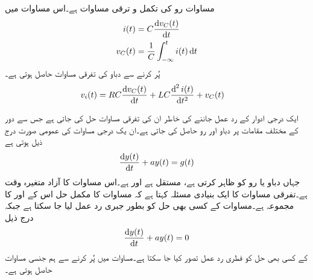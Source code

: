 مساوات  رو   کی تکمل و ترقی مساوات ہے۔اس مساوات میں 
\begin{align*}
i(t)&=C\frac{\dif v_C(t)}{\dif t}\\
v_C(t)&=\frac{1}{C}\int_{-\infty}^{t} i(t)\dif t
\end{align*}
پُر کرنے سے دباو  کی تفرقی مساوات حاصل ہوتی ہے۔
\begin{align}\label{مساوات_عارضی_تکمل_و_تفرقی_ب}
v_i(t)&=R C\frac{\dif v_C(t)}{\dif t}+LC\frac{\dif^{\,2} i(t)}{\dif t^2}+v_C(t)
\end{align}

ایک درجی ادوار کے رد عمل جاننے کی خاطر ان کی تفرقی مساوات حل کی جاتی ہے جس سے دور کے مختلف مقامات پر دباو اور رو حاصل کی جاتی ہے۔ان یک درجی مساوات کی عمومی صورت درج ذیل ہوتی ہے
\begin{align}\label{مساوات_عارضی_یک_درجی_عمومی_مساوات}
\frac{\dif y(t)}{\dif t}+a y(t)= g(t)
\end{align}
جہاں  دباو یا رو کو ظاہر کرتی ہے،  مستقل ہے اور   ہے۔اس مساوات کا آزاد متغیرہ وقت  ہے۔تفرقی مساوات کا ایک بنیادی مسئلہ کہتا ہے کہ مساوات  کا مکمل حل اس کے   اور  
 کا مجموعہ ہے۔مساوات  کے کسی بھی حل کو بطور جبری رد عمل لیا جا سکتا ہے جبکہ درج ذیل 
\begin{align}\label{مساوات_عارضی_یک_درجی_عمومی_مساوات_ب}
\frac{\dif y(t)}{\dif t}+a y(t)=0
\end{align}
 کے کسی بھی حل کو فطری رد عمل تصور کیا جا سکتا ہے۔مساوات  میں  پُر کرنے سے ہم جنسی مساوات  حاصل ہوتی ہے۔

